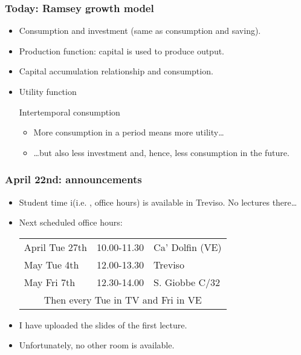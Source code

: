 \documentclass[handout,a4paper]{beamer} 			%
\begin{document}
\begin{frame}
    \frametitle{Today: Ramsey growth model} 
    \begin{itemize}
	\item Consumption and investment (same as consumption and 
	saving).
	
	\item Production function: capital is used to produce output.
	
	\item Capital accumulation relationship and consumption.
	
	\item Utility function

	\begin{alertblock}{Intertemporal consumption}
	    \begin{itemize}
		\item More consumption in a period means more utility\ldots
		
		\item \ldots but also less investment and, hence, 
		less consumption in the future.
	    \end{itemize}
       \end{alertblock}	    

    
    \end{itemize}
\end{frame}

\begin{frame}
    \frametitle{April 22nd: announcements} 
    \begin{itemize}
	\item Student time i(i.e. , office hours) is available in 
	Treviso. No lectures there\ldots
	
	\item Next scheduled office hours:\bigskip
	
	\begin{tabular}{lcl}
	    
	    April Tue 27th & 10.00-11.30 & Ca' Dolfin (VE)  \\
	    
	    May Tue 4th & 12.00-13.30 & Treviso  \\
	    
	    May Fri 7th & 12.30-14.00 & S. Giobbe C/32  \\
	    \hline
	    
	    \multicolumn{3}{c}{Then every Tue in TV and Fri in VE}\\
	     
	\end{tabular}
	
	\item I have uploaded the slides of the first lecture.
	
	\item Unfortunately, no other room is available.
    
    \end{itemize}
\end{frame}
\end{document}
